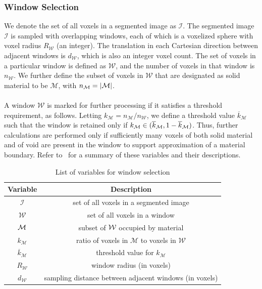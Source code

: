 \subsubsection{Window Selection}

We denote the set of all voxels in a segmented image as $\mathcal{I}$. The segmented image  $\mathcal{I}$ is sampled with overlapping windows, each of which is a voxelized sphere with voxel radius $R_{\mathcal{W}}$ (an integer). The translation in each Cartesian direction between adjacent windows is $d_{\mathcal{W}}$, which is also an integer voxel count. The set of voxels in a particular window is defined as $\mathcal{W}$, and the number of voxels in that window is $n_{\mathcal{W}}$. We further define the subset of voxels in $\mathcal{W}$ that are designated as solid material to be $\mathcal{M}$, with $n_{\mathcal{M}} = | \mathcal{M} |$. \\ \\
%
A window $\mathcal{W}$ is marked for further processing if it satisfies a threshold requirement, as follows.  Letting $k_{\mathcal{M}} = n_{\mathcal{M}}/n_{\mathcal{W}}$, we define a threshold value $\overline{k}_{\mathcal{M}}$ such that the window is retained only if $k_{\mathcal{M}} \in (\overline{k}_{\mathcal{M}}, 1 - \overline{k}_{\mathcal{M}})$.  Thus, further calculations are performed only if sufficiently many voxels of both solid material and of void are present in the window to support approximation of a material boundary. Refer to~ for a summary of these variables and their descriptions. 

\begin{table}[htbp!]
 \centering
   \begin{tabular}{|c||c|}
   \hline
   {\textbf{Variable}} & \textbf{Description} \\ \hline \hline
   $\mathcal{I}$ & set of all voxels in a segmented image \\ \hline
   $\mathcal{W}$ & set of all voxels in a window \\ \hline
   $\mathcal{M}$ & subset of $\mathcal{W}$ occupied by material \\ \hline
   {$k_{\mathcal{M}}$} & ratio of voxels in $\mathcal{M}$ to voxels in $\mathcal{W}$\\ \hline
   {$\overline{k}_{\mathcal{M}}$ \rule{0mm}{4mm}} & threshold value for $k_{\mathcal{M}}$ \\ \hline 
   $R_{\mathcal{W}}$ & window radius (in voxels) \\ \hline
   $d_{\mathcal{W}}$ & sampling distance between adjacent windows (in voxels) \\ \hline  
\end{tabular}
\caption{List of variables for window selection}
\label{tab:window}
\end{table}

